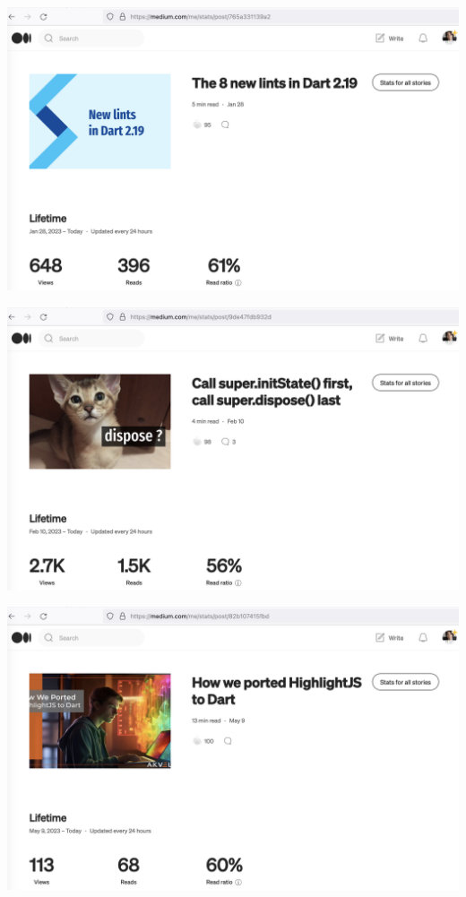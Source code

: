 \begin{center}
    \includegraphics[width=\textwidth]{2023-01-28_lints}
\end{center}

\begin{center}
    \includegraphics[width=\textwidth]{2023-02-10_init}
\end{center}

\begin{center}
    \includegraphics[width=\textwidth]{2023-05-09_highlight}
\end{center}

